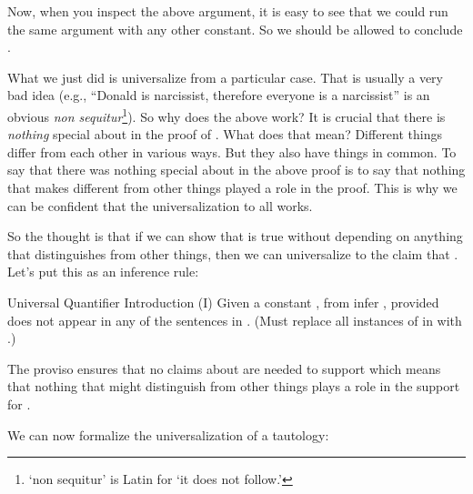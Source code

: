 Now, when you inspect the above argument, it is easy to see that we could run 
the same argument with any other constant. So we should be allowed to conclude 
.


What we just did is universalize from a particular case. That is usually a very 
bad idea (e.g., ``Donald is narcissist, therefore everyone is a narcissist'' is 
an obvious \emph{non sequitur}\footnote{`non sequitur' is Latin for `it does not 
follow.'}).  So why does the above work?  It is crucial that there is 
\emph{nothing} special about  in the proof of .  
What does that mean?  Different things differ from each other in various ways.  
But they also have things in common.  To say that there was nothing special 
about  in the above proof is to say that nothing that makes  different 
from other things played a role in the proof.  This is why we can be confident 
that the universalization to all  works.

So the thought is that if we can show that  is true without depending 
on anything that distinguishes  from other things, then we can universalize 
to the claim that \p{\lforall\upsilon\phi(\upsilon)}. Let's put this as an 
inference rule:

\begin{infrule}

 \item[Universal Quantifier Introduction (\p{\lforall}I)] Given a constant 
  \p{\kappa}, from \p{\seq{\Lambda}
   {\phi(\kappa)}} infer \mbox{\p{\seq{\Lambda}{\lforall\upsilon
  \phi(\upsilon)}}}, provided \p{\kappa} does not appear in any of the sentences 
  in \p{\Lambda}. (Must replace all instances of \p{\kappa} in \p{\phi(\kappa)}  
  with \p{\upsilon}.) 

 \end{infrule}


The proviso ensures that no claims about \p{\kappa} are needed to support 
\p{\phi(\kappa)} which means that nothing that might distinguish \p{\kappa} from 
other things plays a role in the support for \p{\phi(\kappa)}. 

We can now formalize the universalization of a tautology:


\begin{argument*}



\end{argument*}

